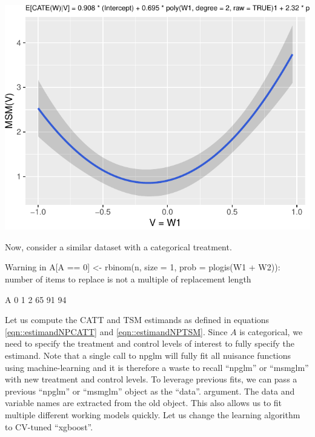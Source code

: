 \documentclass[
]{jss}
\begin{document}
\begin{CodeChunk}
\begin{center}\includegraphics{causalglm_files/figure-latex/unnamed-chunk-4-1} \end{center}

\end{CodeChunk}

Now, consider a similar dataset with a categorical treatment.

\begin{CodeChunk}
\begin{CodeOutput}
Warning in A[A == 0] <- rbinom(n, size = 1, prob = plogis(W1 + W2)): number of
items to replace is not a multiple of replacement length
\end{CodeOutput}
\begin{CodeOutput}
A
 0  1  2 
65 91 94 
\end{CodeOutput}
\end{CodeChunk}

Let us compute the CATT and TSM estimands as defined in equations
\ref{eqn::estimandNPCATT} and \ref{eqn::estimandNPTSM}. Since \(A\) is
categorical, we need to specify the treatment and control levels of
interest to fully specify the estimand. Note that a single call to npglm
will fully fit all nuisance functions using machine-learning and it is
therefore a waste to recall ``npglm'' or ``msmglm'' with new treatment
and control levels. To leverage previous fits, we can pass a previous
``npglm'' or ``msmglm'' object as the ``data''. argument. The data and
variable names are extracted from the old object. This also allows us to
fit multiple different working models quickly. Let us change the
learning algorithm to CV-tuned ``xgboost''.
\end{document}
